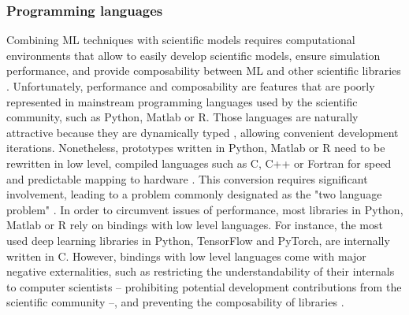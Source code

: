 


\subsubsection*{Programming languages}

Combining ML techniques with scientific models requires computational environments that allow to easily develop scientific models, ensure simulation performance, and provide composability between ML and other scientific libraries \cite{Rackauckas2020}. Unfortunately, performance and composability are features that are poorly represented in mainstream programming languages used by the scientific community, such as Python, Matlab or R.
% 
Those languages are naturally attractive because they are dynamically typed \cite{XX}, allowing convenient development iterations. Nonetheless, prototypes written in Python, Matlab or R need to be rewritten in low level, compiled languages such as C, C++ or Fortran for speed and predictable mapping to hardware \cite{Perkel2019,Bezanson2017}. This conversion requires significant involvement, leading to a problem commonly designated as the "two language problem" \cite{Bezanson2017}.
% 
In order to circumvent issues of performance, most libraries in Python, Matlab or R rely on bindings with low level languages. For instance, the most used deep learning libraries in Python, TensorFlow and PyTorch, are internally written in C. However, bindings with low level languages come with major negative externalities, such as restricting the understandability of their internals to computer scientists -- prohibiting potential development contributions from the scientific community --, and preventing the composability of libraries \cite{XXX}. 

